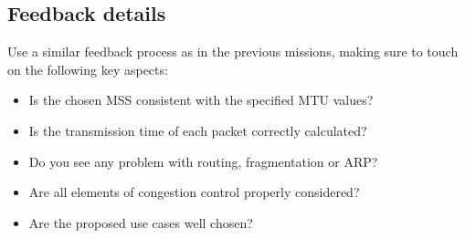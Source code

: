 \vspace{-0.25cm}

\subsection*{Feedback details}

Use a similar feedback process as in the previous missions, making sure to touch on the following key aspects:
\begin{itemize}
\item Is the chosen MSS consistent with the specified MTU values?
\item Is the transmission time of each packet correctly calculated?
\item Do you see any problem with routing, fragmentation or ARP?
\item Are all elements of congestion control properly considered?
\item Are the proposed use cases well chosen?
\end{itemize}
